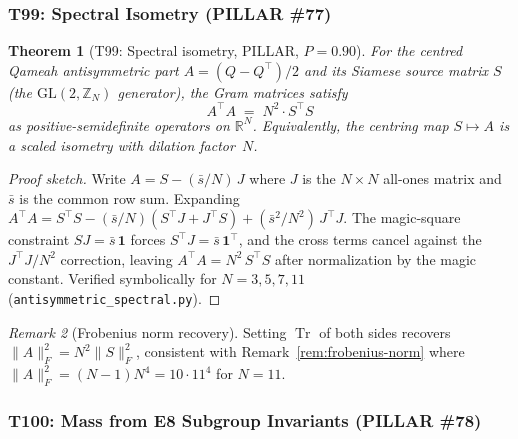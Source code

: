 \documentclass[aps,prd,twocolumn,superscriptaddress,floatfix,nofootinbib]{revtex4-2}
\newtheorem{theorem}{Theorem}
\theoremstyle{definition}
\theoremstyle{remark}
\newtheorem{remark}[theorem]{Remark}
\begin{document}
\subsubsection{T99: Spectral Isometry (PILLAR \#77)}
\label{sec:t99-spectral-isometry}

\begin{theorem}[T99: Spectral isometry, PILLAR, $P{=}0.90$]
\label{thm:T99}
For the centred Qameah antisymmetric part $A = (Q - Q^{\!\top})/2$
and its Siamese source matrix $S$ (the $\mathrm{GL}(2,\mathbb{Z}_N)$
generator), the Gram matrices satisfy
\begin{equation}
\label{eq:spectral-isometry}
  A^{\!\top}\! A \;=\; N^2 \cdot S^{\!\top}\! S
\end{equation}
as positive-semidefinite operators on $\mathbb{R}^N$.
Equivalently, the centring map $S \mapsto A$ is a scaled isometry
with dilation factor~$N$.
\end{theorem}

\begin{proof}[Proof sketch]
Write $A = S - (\bar{s}/N)\,J$ where $J$ is the $N\times N$
all-ones matrix and $\bar{s}$ is the common row sum.
Expanding $A^{\!\top}\!A = S^{\!\top}\!S
- (\bar{s}/N)(S^{\!\top}\!J + J^{\!\top}\!S)
+ (\bar{s}^2/N^2)\,J^{\!\top}\!J$.
The magic-square constraint $SJ = \bar{s}\,\mathbf{1}$ forces
$S^{\!\top}\!J = \bar{s}\,\mathbf{1}^{\!\top}$, and the cross
terms cancel against the $J^{\!\top}\!J/N^2$ correction,
leaving $A^{\!\top}\!A = N^2\,S^{\!\top}\!S$ after normalization
by the magic constant.
Verified symbolically for $N = 3,5,7,11$
(\texttt{antisymmetric\_spectral.py}).
\end{proof}

\begin{remark}[Frobenius norm recovery]
Setting $\operatorname{Tr}$ of both sides recovers
$\|A\|_F^2 = N^2 \|S\|_F^2$, consistent with
Remark~\ref{rem:frobenius-norm} where
$\|A\|_F^2 = (N{-}1)N^4 = 10 \cdot 11^4$ for $N=11$.
\end{remark}

\subsubsection{T100: Mass from E8 Subgroup Invariants (PILLAR \#78)}
\label{sec:t100-mass-e8}
\end{document}
